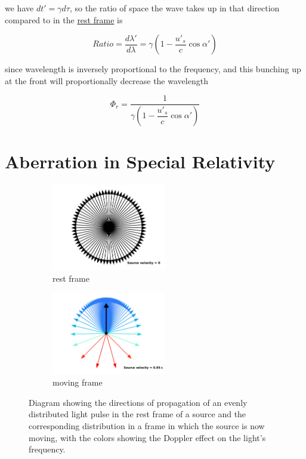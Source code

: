 we have $dt'={\gamma} d\tau$, so the ratio of space the wave takes up in that direction compared to in the \hyperlink{def-proper-frame}{rest frame} is

\begin{equation}
	Ratio = \frac{d\lambda'}{d\lambda} = {\gamma} \left(1-\dfrac{u'_s}{c} \cos\alpha' \right)
\end{equation}

since wavelength is inversely proportional to the frequency, and this bunching up at the front will proportionally decrease the wavelength

\begin{equation}
	\Phi_r = \frac{1}{ {\gamma} \left(1-\dfrac{u'_s}{c} \cos\alpha' \right)}
\end{equation}

\section{Aberration in Special Relativity}

\begin{figure}[ht]
	\begin{subfigure}{.49\textwidth}
		\centering
		\includegraphics[width=5cm]{images/pdf/Aberrated_velocities_restframe.pdf}
		\caption{rest frame}
	\end{subfigure}
	\begin{subfigure}{.49\textwidth}
		\centering
		\includegraphics[width=5cm]{images/pdf/Aberrated_velocities.pdf}
		\caption{moving frame}
	\end{subfigure}
	\caption{Diagram showing the directions of propagation of an evenly distributed light pulse in the rest frame of a source and the corresponding distribution in a frame in which the source is now moving, with the colors showing the Doppler effect on the light's frequency.}
	\label{fig: aberrated emitted light}
\end{figure}

